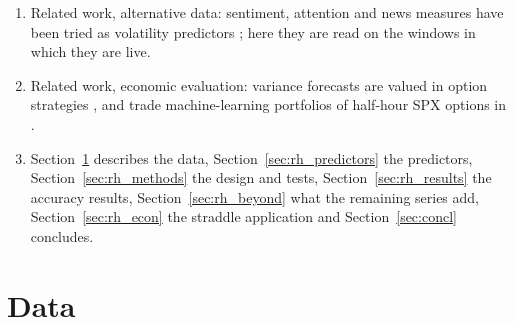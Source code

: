 \begin{enumerate}
  set.
\item Related work, alternative data: sentiment, attention and news measures have been tried as volatility predictors
  \citep{AudrinoSigristBallinari2020,BehrendtSchmidt2018,CaporinPoli2017,MittnikRobinzonovSpindler2015}; here they are
  read on the windows in which they are live.
\item Related work, economic evaluation: variance forecasts are valued in option strategies
  \citep{FlemingKirbyOstdiek2001,BandiFusariReno2023,AlmeidaFreireHizmeri2025,Vilkov2026}, and
  \citet{MaischZhangUlrichZimmer2026} trade machine-learning portfolios of half-hour SPX options in
  \extMaischYear.
\item Section~\ref{sec:rh_data} describes the data, Section~\ref{sec:rh_predictors} the predictors,
  Section~\ref{sec:rh_methods} the design and tests, Section~\ref{sec:rh_results} the accuracy results,
  Section~\ref{sec:rh_beyond} what the remaining series add, Section~\ref{sec:rh_econ} the straddle application and
  Section~\ref{sec:concl} concludes.
\end{enumerate}

\section{Data}
\label{sec:rh_data}

